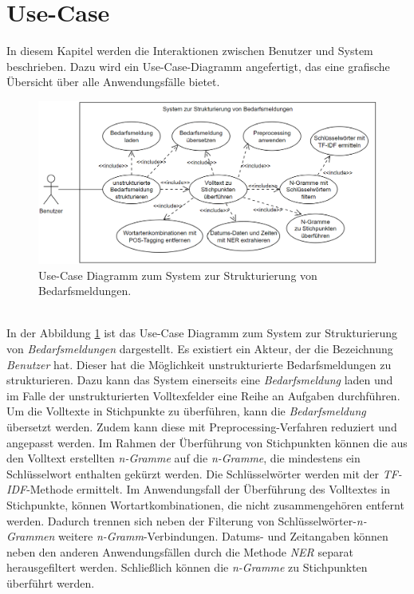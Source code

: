 \section{Use-Case}
\label{sec:usecase}
In diesem Kapitel werden die Interaktionen zwischen Benutzer und System beschrieben. Dazu wird ein Use-Case-Diagramm angefertigt, das eine grafische Übersicht über alle Anwendungsfälle bietet.
\begin{figure}[H]
	\centering  
	\includegraphics[width=\linewidth]{Abbildungen/use-case.png}
	\caption{Use-Case Diagramm zum System zur Strukturierung von Bedarfsmeldungen.}
	\label{fig:usecasediagrammwirklich}
\end{figure}\mbox{} \\
In der Abbildung \ref{fig:usecasediagrammwirklich} ist das Use-Case Diagramm zum System zur Strukturierung von \emph{Bedarfsmeldungen} dargestellt. Es existiert ein Akteur, der die Bezeichnung \emph{Benutzer} hat. Dieser hat die Möglichkeit unstrukturierte Bedarfsmeldungen zu strukturieren. Dazu kann das System einerseits eine \emph{Bedarfsmeldung} laden und im Falle der unstrukturierten Volltexfelder eine Reihe an Aufgaben durchführen. Um die Volltexte in Stichpunkte zu überführen, kann die \emph{Bedarfsmeldung} übersetzt werden. Zudem kann diese mit Preprocessing-Verfahren reduziert und angepasst werden. Im Rahmen der Überführung von Stichpunkten können die aus den Volltext erstellten \emph{n-Gramme} auf die \emph{n-Gramme}, die mindestens ein Schlüsselwort enthalten gekürzt werden. Die Schlüsselwörter werden mit der \emph{TF-IDF}-Methode ermittelt. Im Anwendungsfall der Überführung des Volltextes in Stichpunkte, können Wortartkombinationen, die nicht zusammengehören entfernt werden. Dadurch trennen sich neben der Filterung von Schlüsselwörter-\emph{n-Grammen} weitere \emph{n-Gramm}-Verbindungen. Datums- und Zeitangaben können neben den anderen Anwendungsfällen durch die Methode \emph{NER} separat herausgefiltert werden. Schließlich können die \emph{n-Gramme} zu Stichpunkten überführt werden.
